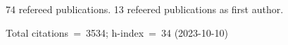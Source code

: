 74 refereed publications. 13 refeered publications as first author.

Total citations~=~3534; h-index~=~34 (2023-10-10)